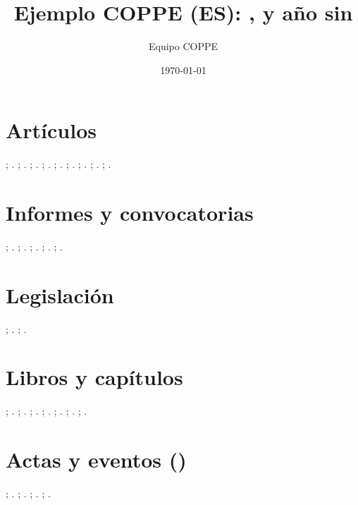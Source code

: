 \documentclass[a4paper,12pt]{article}
\title{Ejemplo COPPE (ES): \string\printurldate, \string\printeventdate y año sin \string\urldate}
\author{Equipo COPPE}
\date{\today}
\begin{document}
\maketitle
\section*{Artículos}
\citet{art-1-complete-doi}; \citep{art-1-complete-doi}.
\citet{art-2-missing-doi-has-url}; \citep{art-2-missing-doi-has-url}.
\citet{art-3-missing-author}; \citep{art-3-missing-author}.
\citet{mag-1-complete}; \citep{mag-1-complete}.
\citet{mag-2-missing-url}; \citep{mag-2-missing-url}.
\citet{news-1-complete}; \citep{news-1-complete}.
\citet{news-2-missing-pages}; \citep{news-2-missing-pages}.
\citet{dou-1-complete}; \citep{dou-1-complete}.
\citet{dou-2-missing-dousection}; \citep{dou-2-missing-dousection}.
\section*{Informes y convocatorias}
\citet{rep-1-generic-complete}; \citep{rep-1-generic-complete}.
\citet{rep-2-generic-missing-org}; \citep{rep-2-generic-missing-org}.
\citet{edital-1-complete}; \citep{edital-1-complete}.
\citet{edital-2-missing-modalidade}; \citep{edital-2-missing-modalidade}.
\citet{edital-3-missing-objeto}; \citep{edital-3-missing-objeto}.
\section*{Legislación}
\citet{leg-1-complete}; \citep{leg-1-complete}.
\citet{leg-2-missing-ementa}; \citep{leg-2-missing-ementa}.
\section*{Libros y capítulos}
\citet{book-1-complete}; \citep{book-1-complete}.
\citet{book-2-missing-author-has-editor}; \citep{book-2-missing-author-has-editor}.
\citet{book-3-missing-publisher-location}; \citep{book-3-missing-publisher-location}.
\citet{incoll-1-complete}; \citep{incoll-1-complete}.
\citet{incoll-2-missing-editor}; \citep{incoll-2-missing-editor}.
\citet{inbook-1-complete}; \citep{inbook-1-complete}.
\citet{inbook-2-missing-edition}; \citep{inbook-2-missing-edition}.
\section*{Actas y eventos (\string\printeventdate)}
\citet{inproc-1-complete}; \citep{inproc-1-complete}.
\citet{inproc-2-missing-event}; \citep{inproc-2-missing-event}.
\citet{proc-1-complete}; \citep{proc-1-complete}.
\citet{proc-2-missing-event}; \citep{proc-2-missing-event}.
\end{document}
